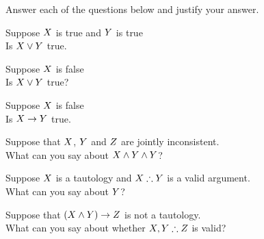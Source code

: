 \begin{practiceproblems}
	
	\solutions
	\problempart
	\label{pr.TT.concepts}
	Answer each of the questions below and justify your answer.
	\begin{earg}
		\item Suppose $X$ is true and $Y$ is true\\Is $X\vee Y$ true.\myanswer{\\true}
		\item Suppose $X$ is false \\Is $X\vee Y$ true?
		\item Suppose $X$ is false \\Is $X\rightarrow Y$ true. \myanswer{\\true}
		\item Suppose that $X$, $Y$ and $Z$  are jointly inconsistent. \\What can you say about $X\mathbin{\wedge}Y\mathbin{\wedge}Y$?
		\item Suppose $X$ is a tautology and  $\metaX\therefore\metaY$ is a valid argument. \\What can you say about $Y$?
		\item Suppose that $(X\mathbin{\wedge}Y)\rightarrow Z$ is not a tautology.\\ What can you say about whether $\metaX, \metaY \therefore\metaZ$ is valid?

\end{earg}
\end{practiceproblems}
